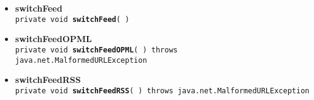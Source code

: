 {{{\begin{itemize}
{\begin{itemize}
{Stop normal operation and exit
}
\end{itemize}
}%
 \item{ 
{\bf switchFeed}\\
{\tt private void\ {\bf switchFeed}(  )
\label{amber.crawler.RSS.switchFeed()}}%
}%
 \item{ 
{\bf switchFeedOPML}\\
{\tt private void\ {\bf switchFeedOPML}(  ) throws java.net.MalformedURLException
\label{amber.crawler.RSS.switchFeedOPML()}}%
}%
 \item{ 
{\bf switchFeedRSS}\\
{\tt private void\ {\bf switchFeedRSS}(  ) throws java.net.MalformedURLException
\label{amber.crawler.RSS.switchFeedRSS()}}%
}%
\end{itemize}
}
}
}

